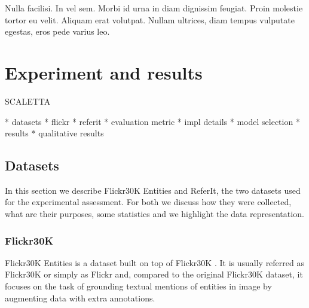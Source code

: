 \begin{savequote}[75mm]
Nulla facilisi. In vel sem. Morbi id urna in diam dignissim feugiat. Proin molestie tortor eu velit. Aliquam erat volutpat. Nullam ultrices, diam tempus vulputate egestas, eros pede varius leo.
\end{savequote}

\chapter{Experiment and results}
\label{ch:experiments}

SCALETTA

* datasets
  * flickr
  * referit
* evaluation metric
* impl details
* model selection
* results
* qualitative results

\section{Datasets}
\label{sec:datasets}

In this section we describe Flickr30K Entities and ReferIt, the two
datasets used for the experimental assessment. For both we discuss how
they were collected, what are their purposes, some statistics and we
highlight the data representation.

\subsection{Flickr30K}
\label{subsec:flickr30k}

Flickr30K Entities \cite{plummer2015flickr30k} is a dataset built on
top of Flickr30K \cite{young2014image}. It is usually referred as
Flickr30K or simply as Flickr and, compared to the original Flickr30K
dataset, it focuses on the task of grounding textual mentions of
entities in image by augmenting data with extra annotations.


